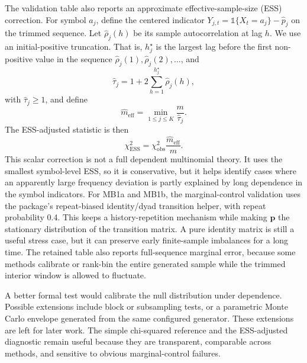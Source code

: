 \documentclass[journal]{IEEEtran}
\newcommand{\vect}[1]{\boldsymbol{#1}}
\begin{document}
The validation table also reports an approximate effective-sample-size (ESS)
correction. For symbol \(a_j\), define the centered indicator
\(Y_{j,t}=\mathbb{1}\{X_t=a_j\}-\hat p_j\) on the trimmed sequence. Let
\(\hat\rho_j(h)\) be its sample autocorrelation at lag \(h\). We use an
initial-positive truncation. That is, \(h_j^\star\) is the largest lag before
the first non-positive value in the sequence
\(\hat\rho_j(1),\hat\rho_j(2),\ldots\), and
\begin{equation}
  \hat\tau_j = 1 + 2\sum_{h=1}^{h_j^\star}\hat\rho_j(h),
\end{equation}
with \(\hat\tau_j\ge 1\), and define
\begin{equation}
  \hat m_{\mathrm{eff}} =
  \min_{1\le j\le K}\frac{m}{\hat\tau_j}.
\end{equation}
The ESS-adjusted statistic is then
\begin{equation}
  \chi^2_{\mathrm{ESS}} = \chi^2_{\mathrm{obs}}\frac{\hat m_{\mathrm{eff}}}{m}.
\end{equation}
This scalar correction is not a full dependent multinomial theory. It uses the
smallest symbol-level ESS, so it is conservative, but it helps identify cases
where an apparently large frequency deviation is partly explained by long
dependence in the symbol indicators.
For MB1a and MB1b, the marginal-control validation uses the package's
repeat-biased identity/dyad transition helper, with repeat probability 0.4.
This keeps a history-repetition mechanism while making \(\vect{p}\) the
stationary distribution of the transition matrix. A pure identity matrix is
still a useful stress case, but it can preserve early finite-sample imbalances
for a long time.
The retained table also reports full-sequence marginal error, because some
methods calibrate or rank-bin the entire generated sample while the trimmed
interior window is allowed to fluctuate.

A better formal test would calibrate the null distribution under dependence.
Possible extensions include block or subsampling tests, or a parametric Monte
Carlo envelope generated from the same configured generator. These extensions
are left for later work. The simple chi-squared reference and the ESS-adjusted
diagnostic remain useful because they are transparent,
comparable across methods, and sensitive to obvious marginal-control failures.
\end{document}
